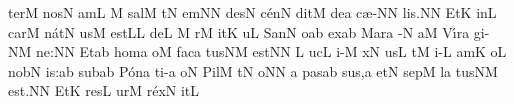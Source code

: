 \sgn ter\punctum M\egn
\spatium
\sgn n{o}s\punctum N\egn
{}am\punctum L\egn
\spatium
\custos M
\lineaproxima
\sgn sal\punctum M\egn
{}t\punctum N\egn
\sgn {}em\punctum N\augmentum N\egn
\spatium
\divisiominima
\spatium
\sgn des\punctum N\egn
\sgn c{\'e}n\punctum N\egn
\sgn dit\punctum M\egn
\spatium
\sgn de{}\punctum a\egn
\spatium
\sgn c{\ae}-\punctum N\augmentum N\egn
\sgn li{s.}\punctum N\augmentum N\egn
\spatium
\divisiofinalis
\spatium
\sgn {}Et\punctum K\egn
\spatium
\sgn {}in\punctum L\egn
\sgn car\punctum M\egn
\sgn n{\'a}t\punctum N\egn
\sgn {}us\punctum M\egn
\spatium
\sgn {}e{st}\punctum L\augmentum L\egn
\spatium
\sgn de{}\punctum L\egn
\spatium
\custos M
\lineaproxima
{}r\punctum M\egn
\sgn {}it\punctum K\egn
\sgn {}u{}\punctum L\egn
\spatium
\sgn S{a}n\punctum N\egn
{}o{}\punctum a\augmentum b\egn
\spatium
\divisiominor
\spatium
\sgn {}ex\pes ab\egn
\spatium
\sgn Mar\punctum a\egn
\sgn {}{\'\i}-\punctum N\egn
\sgn {}a{}\punctum M\egn
\spatium
\sgn V{\'\i}r\punctum a\egn
\sgn gi-\clivis NM\egn
\sgn ne:\punctum N\augmentum N\egn
\spatium
\divisiominor
\spatium
\sgn {}Et\pes ab\egn
\spatium
\sgn h{o}m\punctum a\egn
\sgn {}o{}\punctum M\egn
\spatium
\sgn f{a}c\punctum a\egn
\sgn tus\clivis NM\egn
\spatium
\sgn {}e{st}\punctum N\augmentum N\egn
\spatium
\divisiofinalis
\spatium
\custos L
\lineaproxima
{}uc\punctum L\egn
\sgn {}i-\punctum M\egn
{}x\punctum N\egn
\sgn {}us\punctum L\egn
\spatium
{}t\punctum M\egn
\sgn {}i-\punctum L\egn
\sgn {}am\punctum K\egn
\spatium
{}o{}\punctum L\egn
\spatium
\sgn n{o}b\punctum N\egn
\sgn {}i{s:}\punctum a\augmentum b\egn
\spatium
\divisiominor
\spatium
\sgn sub\pes ab\egn
\spatium
\sgn P{\'o}n\punctum a\egn
\sgn ti-\punctum a\egn
\sgn {}o{}\punctum N\egn
\spatium
\sgn Pil\punctum M\egn
{}t\punctum N\egn
\sgn {}o{}\punctum N\augmentum N\egn
\spatium
\divisiominor
\spatium
\custos a
\lineaproxima
\sgn p{a}s\pes ab\egn
\sgn su{s,}\punctum a\egn
\spatium
\sgn {}et\punctum N\egn
\spatium
\sgn sep\punctum M\egn
{}l\punctum a\egn
\sgn tus\clivis NM\egn
\spatium
\sgn {}e{st.}\punctum N\augmentum N\egn
\spatium
\divisiofinalis
\spatium
\sgn {}Et\punctum K\egn
\spatium
\sgn res\punctum L\egn
\sgn {}ur\punctum M\egn
\sgn r{\'e}x\punctum N\egn
\sgn {}it\punctum L\egn
